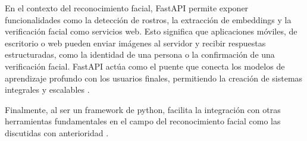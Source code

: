 En el contexto del reconocimiento facial, FastAPI permite exponer funcionalidades como la detección de rostros, la extracción de embeddings y la verificación facial como servicios web. Esto significa que aplicaciones móviles, de escritorio o web pueden enviar imágenes al servidor y recibir respuestas estructuradas, como la identidad de una persona o la confirmación de una verificación facial. FastAPI actúa como el puente que conecta los modelos de aprendizaje profundo con los usuarios finales, permitiendo la creación de sistemas integrales y escalables \cite{FastAPI}.


Finalmente, al ser un framework de python, facilita la integración con otras herramientas fundamentales en el campo del reconocimiento facial como las discutidas con anterioridad \cite{FastAPI}.
